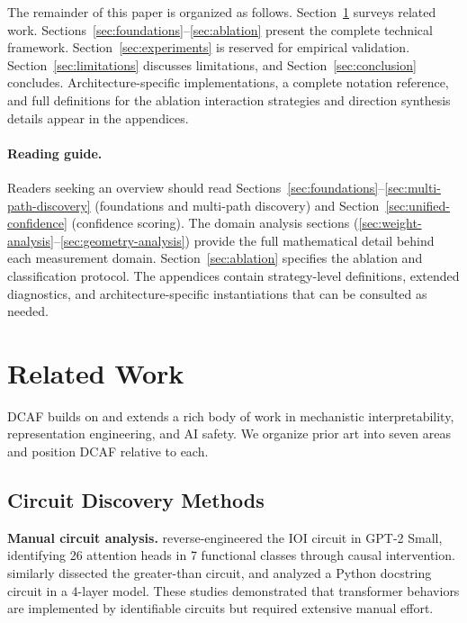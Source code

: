 \documentclass[11pt]{article}
\begin{document}
The remainder of this paper is organized as follows. Section~\ref{sec:related} surveys related work. Sections~\ref{sec:foundations}--\ref{sec:ablation} present the complete technical framework. Section~\ref{sec:experiments} is reserved for empirical validation. Section~\ref{sec:limitations} discusses limitations, and Section~\ref{sec:conclusion} concludes. Architecture-specific implementations, a complete notation reference, and full definitions for the ablation interaction strategies and direction synthesis details appear in the appendices.

\paragraph{Reading guide.} Readers seeking an overview should read Sections~\ref{sec:foundations}--\ref{sec:multi-path-discovery} (foundations and multi-path discovery) and Section~\ref{sec:unified-confidence} (confidence scoring). The domain analysis sections (\ref{sec:weight-analysis}--\ref{sec:geometry-analysis}) provide the full mathematical detail behind each measurement domain. Section~\ref{sec:ablation} specifies the ablation and classification protocol. The appendices contain strategy-level definitions, extended diagnostics, and architecture-specific instantiations that can be consulted as needed.


\section{Related Work}
\label{sec:related}

DCAF builds on and extends a rich body of work in mechanistic interpretability, representation engineering, and AI safety. We organize prior art into seven areas and position DCAF relative to each.

\subsection{Circuit Discovery Methods}
\label{sec:circuit-discovery-methods}

\textbf{Manual circuit analysis.} \citet{wang2023ioi} reverse-engineered the IOI circuit in GPT-2 Small, identifying 26 attention heads in 7 functional classes through causal intervention. \citet{hanna2023greaterthan} similarly dissected the greater-than circuit, and \citet{heimersheim2023docstring} analyzed a Python docstring circuit in a 4-layer model. These studies demonstrated that transformer behaviors are implemented by identifiable circuits but required extensive manual effort.
\end{document}
